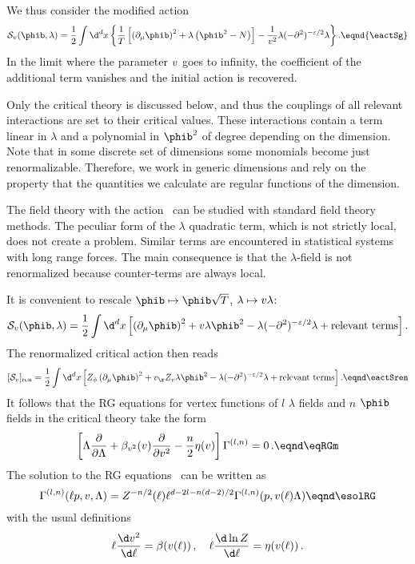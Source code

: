 We thus consider the modified action
$$ {\cal S}_{\vv}  (  \phib ,\lambda ) = {1 \over 2}\int
\d^{d}x \left\{
{1\over T}\left[\left( \partial_{\mu}\phib \right)^2 + \lambda
\left(\phib^2 -N\right)\right]-
{1\over\vv^2}\lambda(-\partial^2)^{-\varepsilon/2}\lambda\right\}
. \eqnd{\eactSg}$$
In the limit where the parameter $v$ goes to infinity, the coefficient of
the additional term vanishes and the initial action is recovered. \par
Only the critical theory is discussed  below, and thus the
couplings of all relevant interactions are set to their critical values.
These interactions contain a term linear in $\lambda$ and a polynomial in
$\phib^2$ of degree depending on the dimension. Note that in some discrete
set of dimensions some monomials become just renormalizable. Therefore, we work
in generic dimensions and rely on the property that the quantities we calculate are regular
functions of the dimension. \par
The field theory with the  action \eactSg~can be studied with
standard field theory methods. The peculiar form of the $\lambda$ quadratic
term, which is not strictly local, does not create a problem. Similar terms
are encountered in statistical systems with long range forces. The
main consequence is
that the $\lambda$-field is not renormalized because counter-terms are
always local.\par
It is convenient to rescale $\phib\mapsto \phib\sqrt{T}$, $\lambda \mapsto
v\lambda$:
$$ {\cal S}_{\vv} ( \phib ,\lambda ) = {1 \over 2}\int \d^{d}x \left[
\left( \partial_{\mu}\phib \right)^2 + \vv\lambda\phib^2
- \lambda(-\partial^2)^{-\varepsilon/2}\lambda +{\rm relevant\
terms}\right].$$
The renormalized critical action then reads
$$[{\cal S}_\vv]_{\rm ren} =  {1 \over 2}\int \d^{d}x \left[
Z_\phi \left( \partial_{\mu}\phib \right)^2 +\vv_\r Z_{\vv}\lambda\phib^2
- \lambda(-\partial^2)^{-\varepsilon/2}\lambda +{\rm relevant\
terms}\right] . \eqnd\eactSren $$
It follows that the RG equations for vertex functions of $l$
$\lambda$ fields and $n$ $\phib$ fields in the critical theory take the
form
$$\left[\Lambda {\partial \over \partial \Lambda}+
\beta_{\vv^2}(\vv){\partial \over \partial \vv^2}-{n\over 2}\eta(\vv)\right]
\Gamma^{(l,n)}=0\,.\eqnd \eqRGm $$
The solution to the RG equations \eqRGm\ can be written as
$$\Gamma^{(l,n)}(\ell p, \vv,\Lambda)=Z^{-n/2}(\ell)
\ell^{d-2l-n(d-2)/2} \Gamma^{(l,n)}(p, \vv(\ell) \Lambda)
\eqnd\esolRG $$
with the usual definitions
$$\ell{\d \vv^2\over \d \ell}=\beta(\vv(\ell))\,,\quad \ell{\d \ln Z
\over \d \ell}=\eta(\vv(\ell))\, .$$
